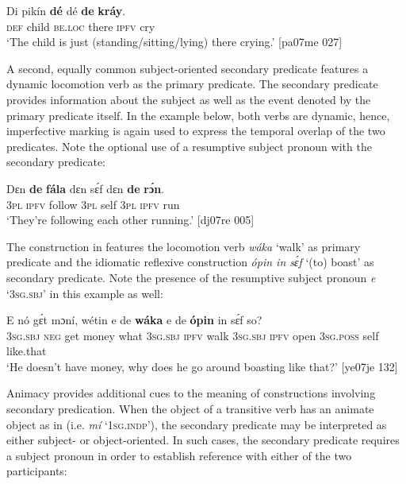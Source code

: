\ea%
    \label{ex:key:1598}
    \gll Di  pikín  \textbf{dé}    dé    \textbf{de}  \textbf{kráy}.\\
\textsc{def}  child  \textsc{be.loc}  there  \textsc{ipfv}  cry\\

\glt ‘The child is just (standing/sitting/lying) there crying.’ [pa07me 027]
\z

A second, equally common subject-oriented secondary predicate features a dynamic locomotion verb as the primary predicate. The secondary predicate provides information about the subject as well as the event denoted by the primary predicate itself. In the example below, both verbs are dynamic, hence, imperfective marking is again used to express the temporal overlap of the two predicates. Note the optional use of a resumptive subject pronoun with the secondary predicate: 


\ea%
    \label{ex:key:1599}
    \gll Dɛn  \textbf{de}  \textbf{fála}    dɛn  sɛ́f  dɛn  \textbf{de}  \textbf{rɔ́n}.\\
\textsc{3pl}  \textsc{ipfv}  follow  \textsc{3pl}  self  \textsc{3pl}  \textsc{ipfv}  run\\

\glt ‘They’re following each other running.’ [dj07re 005]
\z

The construction in  features the locomotion verb \textit{wáka} ‘walk’ as primary predicate and the idiomatic reflexive construction \textit{ópin in sɛ́f} ‘(to) boast’ as secondary predicate. Note the presence of the resumptive subject{\fff} pronoun \textit{e} ‘\textsc{3sg.sbj}’ in this example as well: 


\ea%
    \label{ex:key:1600}
    \gll E    nó  gɛ́t  mɔní,  wétin  e    de  \textbf{wáka}
e    de  \textbf{ópin}  in    sɛ́f  so?\\
\textsc{3sg.sbj}  \textsc{neg}  get  money  what  \textsc{3sg.sbj}  \textsc{ipfv}  walk
\textsc{3sg.sbj}  \textsc{ipfv}  open  \textsc{3sg.poss}  self  like.that\\

\glt ‘He doesn’t have money, why does he go around boasting like that?’ [ye07je 132]
\z

Animacy provides additional cues to the meaning of constructions involving secondary predication. When the object of a transitive verb has an animate object as in  (i.e. \textit{mí} ‘\textsc{1sg.indp’),} the secondary predicate may be interpreted as either subject- or object-oriented. In such cases, the secondary predicate requires a subject pronoun in order to establish reference with either of the two participants:


